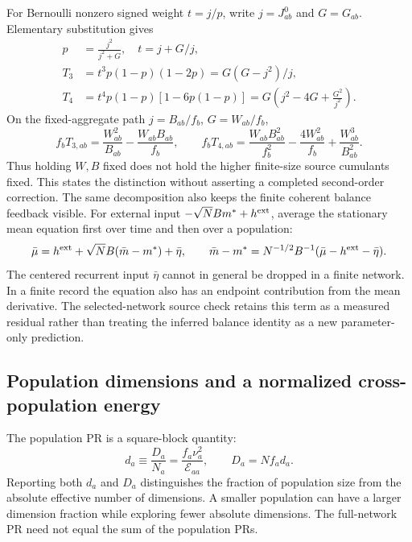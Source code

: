 For Bernoulli nonzero signed weight $t=j/p$, write $j=J^0_{ab}$ and
$G=G_{ab}$. Elementary substitution gives
\begin{align}
 p&=\frac{j^2}{j^2+G},\quad t=j+G/j,\\
 T_3&=t^3p(1-p)(1-2p)=G(G-j^2)/j,\\
 T_4&=t^4p(1-p)[1-6p(1-p)]
        =G\left(j^2-4G+\frac{G^2}{j^2}\right).
\end{align}
On the fixed-aggregate path $j=B_{ab}/f_b$, $G=W_{ab}/f_b$,
\begin{equation}
 f_bT_{3,ab}=\frac{W_{ab}^2}{B_{ab}}
                   -\frac{W_{ab}B_{ab}}{f_b},\qquad
 f_bT_{4,ab}=\frac{W_{ab}B_{ab}^2}{f_b^2}
             -\frac{4W_{ab}^2}{f_b}+\frac{W_{ab}^3}{B_{ab}^2}.
\end{equation}
Thus holding $W,B$ fixed does not hold the higher finite-size source
cumulants fixed. This states the distinction without asserting a completed
second-order correction.
The same decomposition also keeps the finite coherent balance feedback visible.
For external input $-\sqrt N Bm^*+h^{\rm ext}$, average the stationary
mean equation first over time and then over a population:
\begin{equation}
 \bar\mu=h^{\rm ext}+\sqrt N B(\bar m-m^*)+\bar\eta,
 \qquad
 \bar m-m^*=N^{-1/2}B^{-1}(\bar\mu-h^{\rm ext}-\bar\eta).
\end{equation}
The centered recurrent input $\bar\eta$ cannot in general be dropped in a
finite network. In a finite record the equation also has an endpoint
contribution from the mean derivative. The selected-network source check
retains this term as a measured residual rather than treating the inferred
balance identity as a new parameter-only prediction.

\subsection{Population dimensions and a normalized cross-population energy}
The population PR is a square-block quantity:
\begin{equation}
 d_a\equiv\frac{D_a}{N_a}
   =\frac{f_a\nu_a^2}{\mathcal E_{aa}},\qquad
 D_a=Nf_a d_a.
\end{equation}
Reporting both $d_a$ and $D_a$ distinguishes the fraction of population size
from the absolute effective number of dimensions. A smaller population can
have a larger dimension fraction while exploring fewer absolute dimensions.
The full-network PR need not equal the sum of the population PRs.

